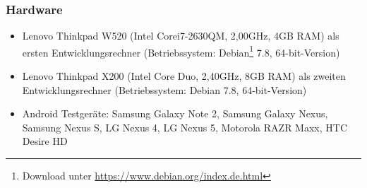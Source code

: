 \subsubsection{Hardware}
\begin{itemize}
	\item Lenovo Thinkpad W520 (Intel\textsuperscript{\textregistered} Core\texttrademark   i7-2630QM, 2,00GHz, 4GB RAM) als ersten Entwicklungsrechner (Betriebssystem: Debian\footnote{ Download unter \url{https://www.debian.org/index.de.html}} 7.8, 64-bit-Version)
	\item Lenovo Thinkpad X200 (Intel\textsuperscript{\textregistered} Core Duo, 2,40GHz, 8GB RAM) als zweiten Entwicklungsrechner (Betriebssystem: Debian 7.8, 64-bit-Version)
	\item Android Testgeräte: Samsung Galaxy Note 2, Samsung Galaxy Nexus, Samsung Nexus S, LG Nexus 4, LG Nexus 5, Motorola RAZR Maxx, HTC Desire HD
\end{itemize}
